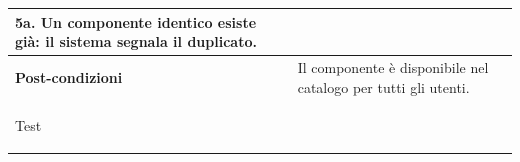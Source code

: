 \documentclass[11pt, a4paper]{article}
\begin{document}
\begin{tabularx}{\textwidth}{|>{\bfseries}p{3.8cm}|X|}
5a. Un componente identico esiste già: il sistema segnala il duplicato. \\

\hline

Post-condizioni & Il componente è disponibile nel catalogo per tutti gli utenti. \\

\hline

Test & \\

\hline

\end{tabularx}



\vspace{10pt}




\noindent
\end{document}
